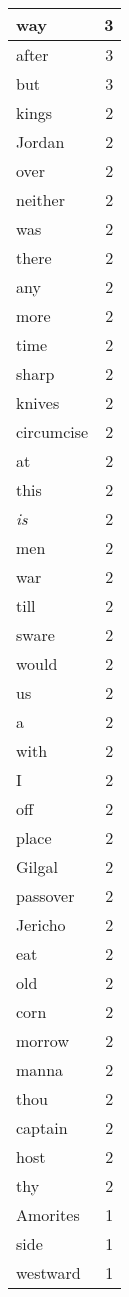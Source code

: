 \begin{center}
\begin{longtable}{l|r}
way & 3 \\ \hline
after & 3 \\ \hline
but & 3 \\ \hline
kings & 2 \\ \hline
Jordan & 2 \\ \hline
over & 2 \\ \hline
neither & 2 \\ \hline
was & 2 \\ \hline
there & 2 \\ \hline
any & 2 \\ \hline
more & 2 \\ \hline
time & 2 \\ \hline
sharp & 2 \\ \hline
knives & 2 \\ \hline
circumcise & 2 \\ \hline
at & 2 \\ \hline
this & 2 \\ \hline
\emph{is} & 2 \\ \hline
men & 2 \\ \hline
war & 2 \\ \hline
till & 2 \\ \hline
sware & 2 \\ \hline
would & 2 \\ \hline
us & 2 \\ \hline
a & 2 \\ \hline
with & 2 \\ \hline
I & 2 \\ \hline
off & 2 \\ \hline
place & 2 \\ \hline
Gilgal & 2 \\ \hline
passover & 2 \\ \hline
Jericho & 2 \\ \hline
eat & 2 \\ \hline
old & 2 \\ \hline
corn & 2 \\ \hline
morrow & 2 \\ \hline
manna & 2 \\ \hline
thou & 2 \\ \hline
captain & 2 \\ \hline
host & 2 \\ \hline
thy & 2 \\ \hline
Amorites & 1 \\ \hline
side & 1 \\ \hline
westward & 1 \\ \hline

\end{longtable}
\end{center}
